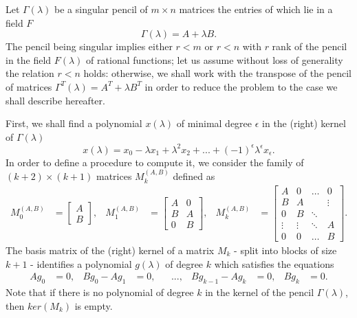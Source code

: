 Let \(\Gamma(\lambda)\) be a singular pencil of \(m \times n\) matrices the entries of which lie in a field \(F\)
\[\Gamma(\lambda) = A + \lambda B.\]
The pencil being singular implies either \(r < m\) or \(r < n\) with \(r\) rank of the pencil in the field \(F(\lambda)\)
of rational functions; let us assume without loss of generality the
relation \(r < n\) holds: otherwise, we shall work with the transpose of the pencil of matrices
\(\Gamma^{T}(\lambda) = A^T + \lambda B^T\) in order to reduce the problem to the case we shall describe hereafter.

First, we shall find a polynomial \(x(\lambda)\) of minimal degree \(\epsilon\) in the (right) kernel
of \(\Gamma(\lambda)\)
\[
    x(\lambda) = x_{0} - \lambda x_{1} + \lambda^2 x_{2} + ... + (-1)^\epsilon \lambda^\epsilon x_{\epsilon}.
\]
In order to define a procedure to compute it, we consider the family of \((k+2) \times (k+1)\) matrices
\(M_{k}^{(A, B)}\) defined as
\begin{align*}
    M_{0}^{(A, B)} &=
        \begin{bmatrix}
            A \\
            B
        \end{bmatrix},
    & M_{1}^{(A, B)} &=
        \begin{bmatrix}
            A & 0 \\
            B & A \\
            0 & B
        \end{bmatrix},
    & M_{k}^{(A, B)} &=
        \begin{bmatrix}
            A & 0 & \hdots &    0   \\
            B & A &        & \vdots \\
            0 & B & \ddots & \\
            \vdots & \vdots & \ddots & A \\
            0      &    0   & \hdots & B
        \end{bmatrix}.
\end{align*}
The basis matrix of the (right) kernel of a matrix \(M_{k}\) - split into blocks of size \(k+1\) - identifies
a polynomial \(g(\lambda)\) of degree \(k\) which satisfies the equations
\begin{align*}
   Ag_{0} &= 0, &
   Bg_{0} - Ag_{1} &= 0, &
   & ..., &
   Bg_{k-1} - Ag_{k} &= 0, &
   Bg_{k} &= 0.
\end{align*}
Note that if there is no polynomial of degree \(k\) in the kernel of the pencil
\(\Gamma(\lambda)\), then \(ker(M_{k})\) is empty.

